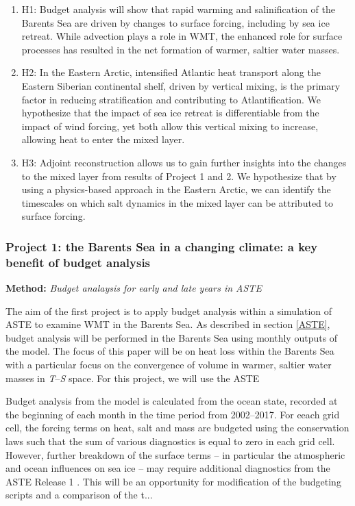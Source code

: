 \documentclass[a4paper,12pt]{article}
\begin{document}
    \begin{enumerate}
        \item H1: Budget analysis will show that rapid warming and salinification of the Barents Sea are driven by changes to surface forcing, including by sea ice retreat. While advection plays a role in WMT, the enhanced role for surface processes has resulted in the net formation of warmer, saltier water masses.
        \item H2: In the Eastern Arctic, intensified Atlantic heat transport along the Eastern Siberian continental shelf, driven by vertical mixing, is the primary factor in reducing stratification and contributing to Atlantification. We hypothesize that the impact of sea ice retreat is differentiable from the impact of wind forcing, yet both allow this vertical mixing to increase, allowing heat to enter the mixed layer.
        \item H3: Adjoint reconstruction allows us to gain further insights into the changes to the mixed layer from results of Project 1 and 2. We hypothesize that by using a physics-based approach in the Eastern Arctic, we can identify the timescales on which salt dynamics in the mixed layer can be attributed to surface forcing.
    \end{enumerate}

    \subsubsection{Project 1: the Barents Sea in a changing climate: a key benefit of budget analysis}
    
    \begin{tcolorbox}[minipage,colback=Goldenrod,arc=10pt,outer arc=10pt]
    \centering
    \textbf{Method:}	\emph{Budget analaysis for early and late years in ASTE}\label{sec1_1}
    \end{tcolorbox}
    The aim of the first project is to apply budget analysis within a simulation of ASTE \cite{Nguyen2021} to examine WMT in the Barents Sea. As described in section \ref{ASTE}, budget analysis will be performed in the Barents Sea using monthly outputs of the model. The focus of this paper will be on heat loss within the Barents Sea with a particular focus on the convergence of volume in warmer, saltier water masses in \emph{T}--\emph{S} space. For this project, we will use the ASTE
    
    Budget analysis from the model is calculated from the ocean state, recorded at the beginning of each month in the time period from 2002--2017. For eeach grid cell, the forcing terms on heat, salt and mass are budgeted using the conservation laws such that the sum of various diagnostics is equal to zero in each grid cell. However, further breakdown of the surface terms -- in particular the atmospheric and ocean influences on sea ice -- may require additional diagnostics from the ASTE Release 1 \cite{Nguyen2021}. This will be an opportunity for modification of the budgeting scripts and a comparison of the t...
\end{document}
